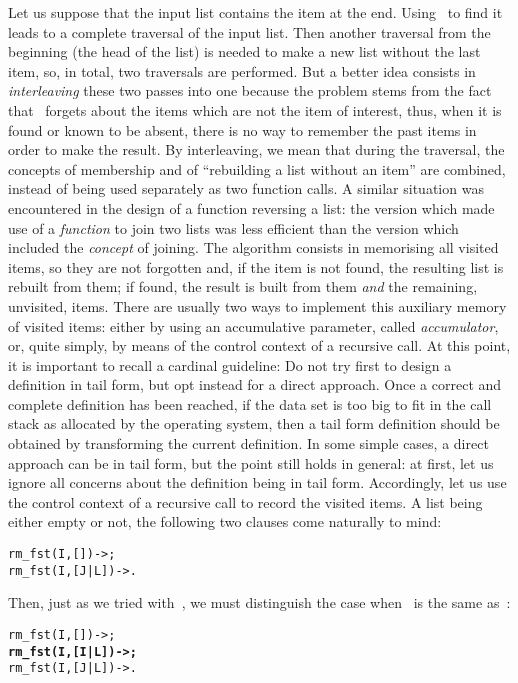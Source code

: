 Let us suppose that the input list contains the item at the
end. Using~ to find it leads to a complete traversal of
the input list. Then another traversal from the beginning (the head of
the list) is needed to make a new list without the last item, so, in
total, two traversals are performed. But a better idea consists in
\emph{interleaving} these two passes into one because the problem
stems from the fact that ~forgets about the items which
are not the item of interest, thus, when it is found or known to be
absent, there is no way to remember the past items in order to make
the result. By interleaving, we mean that during the traversal, the
concepts of membership and of ``rebuilding a list without an item''
are combined, instead of being used separately as two function
calls. A similar situation was encountered in the design of a function
reversing a list: the version which made use of a \emph{function} to
join two lists was less efficient than the version which included the
\emph{concept} of joining. The algorithm consists in memorising all
visited items, so they are not forgotten and, if the item is not
found, the resulting list is rebuilt from them; if found, the result
is built from them \emph{and} the remaining, unvisited, items. There
are usually two ways to implement this auxiliary memory of visited
items: either by using an accumulative parameter, called
\emph{accumulator}, or, quite simply, by means of the control context
of a recursive call. At this point, it is important to recall a
cardinal guideline: Do not try first to design a definition in tail
form, but opt instead for a direct approach. Once a correct and
complete definition has been reached, if the data set is too big to
fit in the call stack as allocated by the operating system, then a
tail form definition should be obtained by transforming the current
definition.  In some simple cases, a direct approach can be in tail
form, but the point still holds in general: at first, let us ignore
all concerns about the definition being in tail form. Accordingly, let
us use the control context of a recursive call to record the visited
items. A list being either empty or not, the following two clauses
come naturally to mind:
\begin{alltt}
rm_fst(I,   []) -> \fbcode{[J|rm_fst(I,L)]};
rm_fst(I,[J|L]) -> \fbcode{[J|rm_fst(I,L)]}.
\end{alltt}
Then, just as we tried with~, we must distinguish the
case when ~is the same as~:
\begin{alltt}
rm_fst(I,   []) -> \fbcode{[J|rm_fst(I,L)]};
\textbf{rm_fst(I,[I|L]) ->} \fbcode{[J|rm_fst(I,L)]}\textbf{;}\hfill% \emph{Equality constraint}
rm_fst(I,[J|L]) -> \fbcode{[J|rm_fst(I,L)]}.
\end{alltt}
